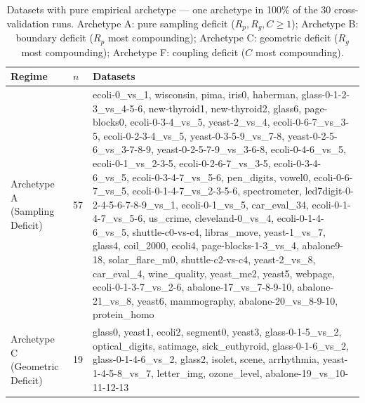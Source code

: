 \begin{table}[ht]
\centering
\caption{Datasets with pure empirical archetype --- one archetype in 100\% of the 30 cross-validation runs. Archetype A: pure sampling deficit ($R_p,R_g,C \geq 1$); Archetype B: boundary deficit ($R_p$ most compounding); Archetype C: geometric deficit ($R_g$ most compounding); Archetype F: coupling deficit ($C$ most compounding).}
\label{tab:pure_regimes}
\scriptsize
\begin{tabular}{llp{8cm}}
\toprule
\textbf{Regime} & \textbf{$n$} & \textbf{Datasets} \\
\midrule
    Archetype A (Sampling Deficit) & 57 & ecoli-0\_vs\_1, wisconsin, pima, iris0, haberman, glass-0-1-2-3\_vs\_4-5-6, new-thyroid1, new-thyroid2, glass6, page-blocks0, ecoli-0-3-4\_vs\_5, yeast-2\_vs\_4, ecoli-0-6-7\_vs\_3-5, ecoli-0-2-3-4\_vs\_5, yeast-0-3-5-9\_vs\_7-8, yeast-0-2-5-6\_vs\_3-7-8-9, yeast-0-2-5-7-9\_vs\_3-6-8, ecoli-0-4-6\_vs\_5, ecoli-0-1\_vs\_2-3-5, ecoli-0-2-6-7\_vs\_3-5, ecoli-0-3-4-6\_vs\_5, ecoli-0-3-4-7\_vs\_5-6, pen\_digits, vowel0, ecoli-0-6-7\_vs\_5, ecoli-0-1-4-7\_vs\_2-3-5-6, spectrometer, led7digit-0-2-4-5-6-7-8-9\_vs\_1, ecoli-0-1\_vs\_5, car\_eval\_34, ecoli-0-1-4-7\_vs\_5-6, us\_crime, cleveland-0\_vs\_4, ecoli-0-1-4-6\_vs\_5, shuttle-c0-vs-c4, libras\_move, yeast-1\_vs\_7, glass4, coil\_2000, ecoli4, page-blocks-1-3\_vs\_4, abalone9-18, solar\_flare\_m0, shuttle-c2-vs-c4, yeast-2\_vs\_8, car\_eval\_4, wine\_quality, yeast\_me2, yeast5, webpage, ecoli-0-1-3-7\_vs\_2-6, abalone-17\_vs\_7-8-9-10, abalone-21\_vs\_8, yeast6, mammography, abalone-20\_vs\_8-9-10, protein\_homo \\
    Archetype C (Geometric Deficit) & 19 & glass0, yeast1, ecoli2, segment0, yeast3, glass-0-1-5\_vs\_2, optical\_digits, satimage, sick\_euthyroid, glass-0-1-6\_vs\_2, glass-0-1-4-6\_vs\_2, glass2, isolet, scene, arrhythmia, yeast-1-4-5-8\_vs\_7, letter\_img, ozone\_level, abalone-19\_vs\_10-11-12-13 \\
\bottomrule
\end{tabular}
\end{table}